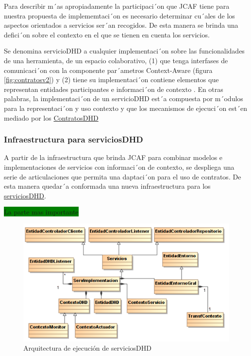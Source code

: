 Para describir m´as apropiadamente la participaci´on que JCAF tiene para 
nuestra propuesta de implememtaci´on es necesario determinar cu´ales de los
aspectos orientados a servicios ser´an recogidos. De esta manera se brinda una
defici´on sobre el contexto en el que se tienen en cuenta los servicios.


\begin{defi}[ServiciosDHD:] \label{serviciosDHD}
Se denomina servicioDHD a cualquier implementaci´on sobre las funcionalidades
de una herramienta, de un espacio colaborativo, (1) que tenga interfases de
comunicaci´on con la componente par´ametros Context-Aware (figura
\ref{fig:contratosv2}) y  (2) tiene su implementaci´on contiene elementos que
representan entidades participantes e informaci´on de contexto \cite{Dey}. En
otras palabras, la implementaci´on de un servicioDHD est´a compuesta por
m´odulos para la representaci´on y uso contexto y que los mecanismos de
ejecuci´on est´en mediado por los \hyperref[contratosdhd]{ContratosDHD} 

\end{defi}


\subsubsection{Infraestructura para serviciosDHD}


A partir de la infraestructura que brinda JCAF para combinar modelos e
implementaciones de servicios con informaci´on de contexto, se despliega una
serie de articulaciones que permita una daptaci´on para el uso de contratos. De
esta manera quedar´a conformada una nueva infraestructura para los
\hyperref[serviciosDHD]{serviciosDHD}.  

\colorbox{green}{La parte mas importante}



\begin{figure}
\begin{center}
\includegraphics[width=5 in,totalheight=3.2 in]{Ch4/jcaf.png}
\caption{Arquitectura de ejecución de serviciosDHD}
\label{hiperplanos}
\end{center}
\end{figure}


